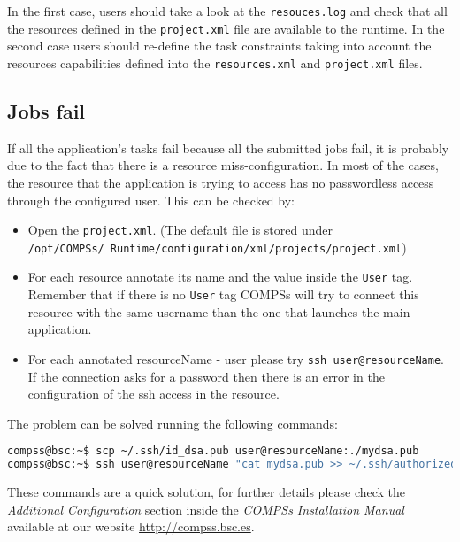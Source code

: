 In the first case, users should take a look at the \texttt{resouces.log} and check that all the resources
defined in the \texttt{project.xml} file are available to the runtime. In the second case users should re-define the task 
constraints taking into account the resources capabilities defined into the \texttt{resources.xml} and \texttt{project.xml} files.


%
%
\subsection{Jobs fail}

If all the application's tasks fail because all the submitted jobs fail, it is probably due to the fact that there is a resource 
miss-configuration. In most of the cases, the resource that the application is trying to access has no passwordless access through
the configured user. This can be checked by:

\begin{itemize}
 \item Open the \texttt{project.xml}. (The default file is stored under \\ \texttt{/opt/COMPSs/
 Runtime/configuration/xml/projects/project.xml})
 \item For each resource annotate its name and the value inside the \texttt{User} tag. Remember that if there is no \texttt{User}
 tag COMPSs will try to connect this resource with the same username than the one that launches the main application.
 \item For each annotated resourceName - user please try \texttt{ssh user@resourceName}. If the connection asks for a password then
 there is an error in the configuration of the ssh access in the resource.
\end{itemize}

The problem can be solved running the following commands:

\begin{lstlisting}[language=bash]
compss@bsc:~$ scp ~/.ssh/id_dsa.pub user@resourceName:./mydsa.pub
compss@bsc:~$ ssh user@resourceName "cat mydsa.pub >> ~/.ssh/authorized_keys; rm ./mydsa.pub"
\end{lstlisting}

These commands are a quick solution, for further details please check the \textit{Additional Configuration} section 
inside the \textit{COMPSs Installation Manual} available at our website \url{http://compss.bsc.es}.


%
%
